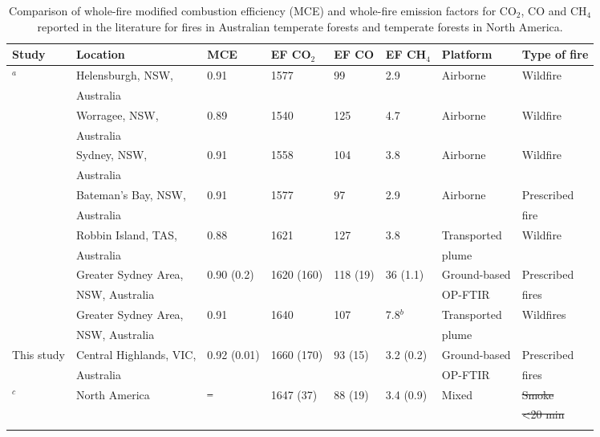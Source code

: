 \documentclass[acp, manuscript]{copernicus}
\providecommand{\DIFadd}[1]{{\protect\color{blue}\uwave{#1}}} %
\providecommand{\DIFdel}[1]{{\protect\color{red}\sout{#1}}}                      %
\providecommand{\DIFaddFL}[1]{\DIFadd{#1}} %
\providecommand{\DIFdelFL}[1]{\DIFdel{#1}} %
\providecommand{\DIFaddbeginFL}{} %
\providecommand{\DIFaddendFL}{} %
\providecommand{\DIFdelbeginFL}{} %
\providecommand{\DIFdelendFL}{} %
\begin{document}
\begin{table}
 \caption{Comparison of whole-fire modified combustion efficiency (MCE) and whole-fire emission factors for CO$_2$, CO and CH$_4$ reported in the literature for fires in Australian temperate forests and temperate forests in North America.}
 \begin{tabular}{l l l l l l l l } 
   \tophline
   Study & Location & MCE & EF CO$_2$ & EF CO & EF CH$_4$ & Platform & Type of fire \\ 
   \hline
   \citet{Hurst1996}$^a$ & Helensburgh, NSW, & 0.91 & 1577 & 99&2.9 & Airborne & Wildfire\\
   &Australia &&&&&&\\ 
   & Worragee, NSW,& 0.89 & 1540 & 125 & 4.7 & Airborne & Wildfire \\
   &Australia &&&&&&\\ 
   & Sydney, NSW, & 0.91 & 1558 & 104 & 3.8 & Airborne & Wildfire \\
   & Australia &&&&&&\\ 
   & Bateman's Bay, NSW,& 0.91 & 1577 & 97 &2.9 & Airborne & Prescribed  \\
   & Australia &&&&&& \DIFdelbeginFL %
\DIFdelendFL fire\\ 
  \citet{Lawson2015} & Robbin Island, TAS, & 0.88 & 1621 & 127 &3.8 & Transported  & Wildfire \\
  & Australia & & & & & plume & \\
  \citet{Paton-Walsh2014} & Greater Sydney Area, & 0.90 (0.2) & 1620 (160) & 118 (19) & 36 (1.1) & Ground-based  & Prescribed \\
      &  NSW, Australia& & & & & OP-FTIR& fires \\
   \citet{Rea2016} & Greater Sydney Area, & 0.91 & 1640& 107& 7.8$^b$& Transported  & Wildfires \\
     & NSW, Australia& & & & & plume& \\   
   This study & Central Highlands, VIC, & 0.92 (0.01) & 1660 (170) & 93 (15) & 3.2 (0.2) & Ground-based & Prescribed  \\
     &Australia & & & & & OP-FTIR & fires\\
   \citet{Akagi2011}$^c$ & North America & \DIFdelbeginFL \DIFdelFL{-- }\DIFdelendFL \DIFaddbeginFL \DIFaddFL{$\sim$0.92 }\DIFaddendFL & 1647 (37) & 88 (19) & 3.4 (0.9) & Mixed & \DIFdelbeginFL \DIFdelFL{Smoke }\DIFdelendFL \DIFaddbeginFL \DIFaddFL{Prescribed }\DIFaddendFL \\ 
  & & & & & & &  \DIFdelbeginFL \DIFdelFL{<20 min }\DIFdelendFL \DIFaddbeginFL \DIFaddFL{$\&$ wild fires }\DIFaddendFL \\ 
 \bottomhline
 \end{tabular}
\DIFdelbeginFL %


\end{table}
\end{document}
